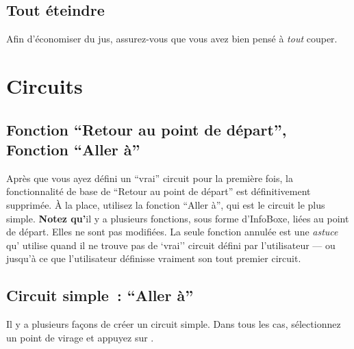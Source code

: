\documentclass[french, a4paper, 12pt]{refrep}
\begin{document}
\subsection*{\textcolor{flashblue}{Tout éteindre}}
Afin d'économiser du jus, assurez-vous que vous avez bien pensé à \emph{tout} couper.

\section{Circuits}

\subsection{\textcolor{flashblue}{Fonction ``Retour au point de départ'', Fonction ``Aller à''}}
Après que vous ayez défini un ``vrai'' circuit pour la première fois, la fonctionnalité de base
de ``Retour au point de départ'' est définitivement supprimée. À la place, utilisez la fonction
``Aller à'', qui est le circuit le plus simple. \textbf{Notez qu'}il y a plusieurs fonctions, sous
forme d'InfoBoxe, liées au point de départ. Elles ne sont pas modifiées.
La seule fonction annulée est une \emph{astuce} qu'\xc{} utilise quand
il ne trouve pas de `vrai'' circuit défini par l'utilisateur --- ou jusqu'à ce que l'utilisateur définisse 
vraiment son tout premier circuit.

\subsection{\textcolor{flashblue}{Circuit simple~: ``Aller à''}}
Il y a plusieurs façons de créer un circuit simple. Dans tous les cas, sélectionnez un
point de virage et appuyez sur .
\end{document}
